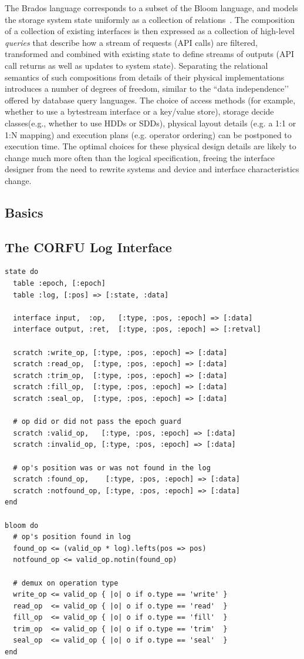 \documentclass[10pt,twocolumn]{article}
\begin{document}
The Brados language corresponds to a subset of the Bloom language, and models the
storage system state uniformly as a collection of
relations~\cite{alvaro:cidr11}. The composition of a collection of existing
interfaces is then expressed as a collection of high-level \emph{queries} that
describe how a stream of requests (API calls) are filtered, transformed and
combined with existing state to define streams of outputs (API call returns as
well as updates to system state).  Separating the relational semantics of such
compositions from details of their physical implementations introduces a
number of degrees of freedom, similar to the ``data independence’’ offered by
database query languages.  The choice of access methods (for example, whether
to use a bytestream interface or a key/value store), storage decide
classes(e.g., whether to use HDDs or SDDs), physical layout details (e.g. a
1:1 or 1:N mapping) and execution plans (e.g.  operator ordering) can be
postponed to execution time.  The optimal choices for these physical design
details are likely to change much more often than the logical specification,
freeing the interface designer from the need to rewrite systems and device and
interface characteristics change.  

\subsection{Basics}

\subsection{The CORFU Log Interface}

\begin{lstlisting}[caption={Epoch Guard}, label=lst:eg]
state do
  table :epoch, [:epoch]
  table :log, [:pos] => [:state, :data]

  interface input,  :op,   [:type, :pos, :epoch] => [:data]
  interface output, :ret,  [:type, :pos, :epoch] => [:retval]

  scratch :write_op, [:type, :pos, :epoch] => [:data]
  scratch :read_op,  [:type, :pos, :epoch] => [:data]
  scratch :trim_op,  [:type, :pos, :epoch] => [:data]
  scratch :fill_op,  [:type, :pos, :epoch] => [:data]
  scratch :seal_op,  [:type, :pos, :epoch] => [:data]

  # op did or did not pass the epoch guard
  scratch :valid_op,   [:type, :pos, :epoch] => [:data]
  scratch :invalid_op, [:type, :pos, :epoch] => [:data]

  # op's position was or was not found in the log
  scratch :found_op,    [:type, :pos, :epoch] => [:data]
  scratch :notfound_op, [:type, :pos, :epoch] => [:data]
end

bloom do
  # op's position found in log
  found_op <= (valid_op * log).lefts(pos => pos)
  notfound_op <= valid_op.notin(found_op)

  # demux on operation type
  write_op <= valid_op { |o| o if o.type == 'write' }
  read_op  <= valid_op { |o| o if o.type == 'read'  }
  fill_op  <= valid_op { |o| o if o.type == 'fill'  }
  trim_op  <= valid_op { |o| o if o.type == 'trim'  }
  seal_op  <= valid_op { |o| o if o.type == 'seal'  }
end
\end{lstlisting}
\end{document}
